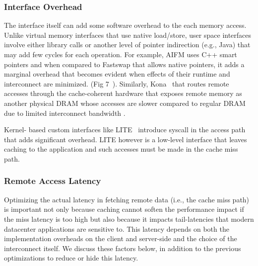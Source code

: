\subsubsection{Interface Overhead}
The interface itself can add some software overhead 
to the each memory access. Unlike virtual memory 
interfaces that use native load/store, user space 
interfaces involve either library calls or another 
level of pointer indirection (e.g., Java) that may add 
few cycles for each operation. For example, AIFM uses
C++ smart pointers and when compared to Fastswap that 
allows native pointers, it adds a marginal overhead 
that becomes evident when effects of their runtime and 
interconnect are minimized. (Fig 7~\cite{aifm}). 
Similarly, Kona~\cite{kona} that routes remote accesses
through the cache-coherent hardware that exposes remote 
memory as another physical DRAM whose accesses are 
slower compared to regular DRAM due to limited interconnect 
bandwidth .

Kernel-
based custom interfaces like LITE~\cite{literdma} 
introduce syscall in the access path that adds 
significant overhead. LITE however is a low-level 
interface that leaves caching to the application and 
such accesses must be made in the cache miss path. 


\subsubsection{Remote Access Latency} 
Optimizing the actual latency in fetching remote data 
(i.e., the cache miss path) is important not only because 
caching cannot soften the performance impact if the miss 
latency is too high but also because it impacts tail-latencies 
that modern datacenter applications are sensitive to. 
This latency depends on both the implementation 
overheads on the client and server-side and the choice of 
the interconnect itself. We discuss these factors below, 
in addition to the previous optimizations to reduce or 
hide this latency.

